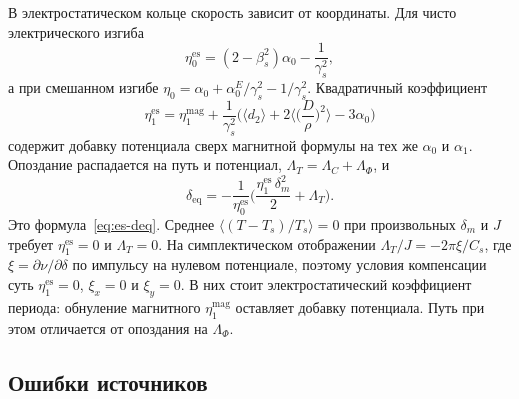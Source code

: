 \documentclass[aps,pra,preprint,a4paper,amsmath,amssymb,longbibliography]{revtex4-2}
\begin{document}
В электростатическом кольце скорость зависит от координаты. Для чисто электрического изгиба
\begin{equation*}
\eta_0^{\mathrm{es}}=(2-\beta_s^2)\alpha_0-\frac{1}{\gamma_s^2},
\end{equation*}
а при смешанном изгибе $\eta_0=\alpha_0+\alpha_0^{E}/\gamma_s^2-1/\gamma_s^2$. Квадратичный коэффициент
\begin{equation*}
\eta_1^{\mathrm{es}}
=\eta_1^{\mathrm{mag}}
+\frac{1}{\gamma_s^2}
\Biggl(
\langle d_2\rangle
+2\Biggl\langle\Biggl(\frac{D}{\rho}\Biggr)^2\Biggr\rangle
-3\alpha_0
\Biggr)
\end{equation*}
содержит добавку потенциала сверх магнитной формулы на тех же $\alpha_0$ и $\alpha_1$. Опоздание распадается на путь и потенциал, $\Lambda_T=\Lambda_C+\Lambda_\Phi$, и
\begin{equation*}
\delta_{\mathrm{eq}}
=-\frac{1}{\eta_0^{\mathrm{es}}}
\Biggl(
\frac{\eta_1^{\mathrm{es}}\,\delta_m^2}{2}
+\Lambda_T
\Biggr).
\end{equation*}
Это формула~\eqref{eq:es-deq}. Среднее $\langle(T-T_s)/T_s\rangle=0$ при произвольных $\delta_m$ и $J$ требует $\eta_1^{\mathrm{es}}=0$ и $\Lambda_T=0$. На симплектическом отображении $\Lambda_T/J=-2\pi\xi/C_s$, где $\xi=\partial\nu/\partial\delta$ по импульсу на нулевом потенциале, поэтому условия компенсации суть $\eta_1^{\mathrm{es}}=0$, $\xi_x=0$ и $\xi_y=0$. В них стоит электростатический коэффициент периода: обнуление магнитного $\eta_1^{\mathrm{mag}}$ оставляет добавку потенциала. Путь при этом отличается от опоздания на $\Lambda_\Phi$.

\subsection{Ошибки источников}
\label{sec:errata}
\end{document}
